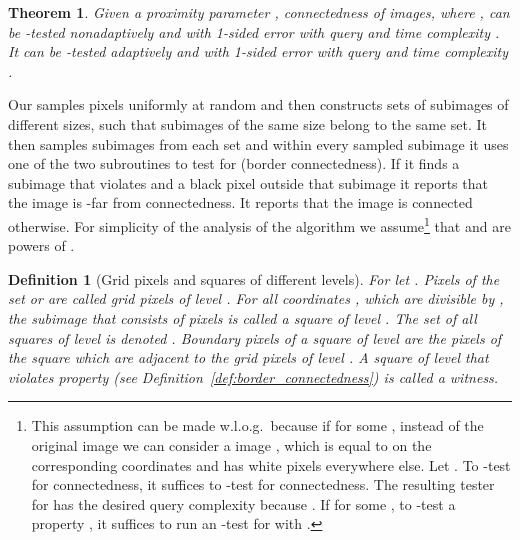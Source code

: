 \documentclass[11pt,english]{article}
\newtheorem{theorem}{Theorem}[section]
\newtheorem{definition}{Definition}[section]
\numberwithin{figure}{section}
\begin{document}
 \begin{theorem}\label{thm:connectedness_tester}
Given a proximity parameter , connectedness of  images, where  , can be -tested nonadaptively and with 1-sided error with query and time complexity .
It can be -tested adaptively and with 1-sided error with query and time complexity .
\end{theorem}

Our  samples pixels uniformly at random and
then constructs sets of subimages of different sizes, such that subimages of the
same size belong to the same set.
It then samples subimages from each set and within every sampled subimage
it uses one of the two subroutines to test for  (border
connectedness). If it finds a subimage that violates  and a black
pixel outside that subimage it reports that the image is -far from
connectedness. It reports that the image is connected otherwise. For simplicity
of the analysis of the algorithm we assume\footnote {This assumption can be made
w.l.o.g.\ because if  for some  , instead of the original image  we can consider a  image , which is equal to  on the corresponding coordinates and has white pixels everywhere else. Let
.
To -test  for connectedness, it suffices to -test  for connectedness.
The resulting tester for  has the desired query complexity because . If  for
some , to -test a property , it suffices to run an -test for  with  .} that  and  are powers of
.

\begin{definition}[Grid pixels and squares of different levels]
\label{def:Grid_pixels_squares_of_different_levels}
For  let .
Pixels of the set  or  are called
\emph{grid pixels of level  .} For all coordinates , which are divisible by ,
the  subimage that consists of pixels  is
called a \emph{square of level}  . The set of all squares of level   is denoted .
{\em Boundary pixels} of a square of level   are the pixels of the square which are adjacent to the grid pixels of level  . A square of level   that violates property  (see Definition~\ref{def:border_connectedness}) is called a \emph{witness}.
\end{definition}
\end{document}
